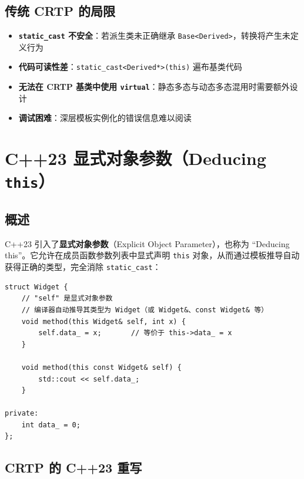 \documentclass[12pt,a4paper,fontset=fandol]{ctexbook}
\begin{document}
\subsection{传统 CRTP 的局限}

\begin{itemize}[leftmargin=2em]
  \item \textbf{\texttt{static\_cast} 不安全}：若派生类未正确继承 \texttt{Base<Derived>}，转换将产生未定义行为
  \item \textbf{代码可读性差}：\texttt{static\_cast<Derived*>(this)} 遍布基类代码
  \item \textbf{无法在 CRTP 基类中使用 \texttt{virtual}}：静态多态与动态多态混用时需要额外设计
  \item \textbf{调试困难}：深层模板实例化的错误信息难以阅读
\end{itemize}

\section{C++23 显式对象参数（Deducing \texttt{this}）}

\subsection{概述}

C++23 引入了\textbf{显式对象参数}（Explicit Object Parameter），也称为 ``Deducing this''。它允许在成员函数参数列表中显式声明 \texttt{this} 对象，从而通过模板推导自动获得正确的类型，完全消除 \texttt{static\_cast}：

\begin{lstlisting}[caption={C++23 显式对象参数语法}]
struct Widget {
    // "self" 是显式对象参数
    // 编译器自动推导其类型为 Widget（或 Widget&、const Widget& 等）
    void method(this Widget& self, int x) {
        self.data_ = x;       // 等价于 this->data_ = x
    }

    void method(this const Widget& self) {
        std::cout << self.data_;
    }

private:
    int data_ = 0;
};
\end{lstlisting}

\subsection{CRTP 的 C++23 重写}
\end{document}
